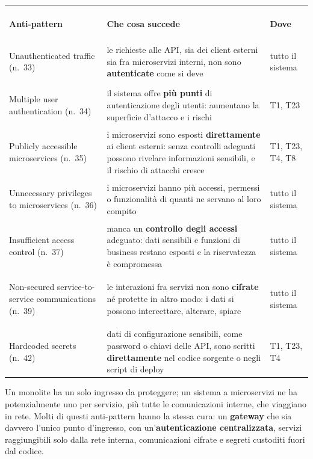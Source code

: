 \begin{center}
\renewcommand{\arraystretch}{1.3}
\begin{tabular}{@{}>{\bfseries\raggedright\arraybackslash}p{3.7cm} >{\raggedright\arraybackslash}p{9.6cm}
                >{\raggedright\arraybackslash}p{2.1cm}@{}}
  \toprule
  \multicolumn{3}{@{}l}{\textcolor{swteal}{\textbf{Sicurezza}}} \\
  \normalfont\textbf{Anti-pattern} & \textbf{Che cosa succede} & \textbf{Dove} \\
  \midrule
  Unauthenticated traffic (n.~33) & le richieste alle API, sia dei client esterni sia fra microservizi interni, non sono
    \textbf{autenticate} come si deve & tutto il sistema \\
  Multiple user authentication (n.~34) & il sistema offre \textbf{più punti} di autenticazione degli utenti: aumentano la
    superficie d'attacco e i rischi & T1, T23 \\
  Publicly accessible microservices (n.~35) & i microservizi sono esposti \textbf{direttamente} ai client esterni: senza
    controlli adeguati possono rivelare informazioni sensibili, e il rischio di attacchi cresce & T1, T23, T4, T8 \\
  Unnecessary privileges to microservices (n.~36) & i microservizi hanno più accessi, permessi o funzionalità di quanti
    ne servano al loro compito & tutto il sistema \\
  Insufficient access control (n.~37) & manca un \textbf{controllo degli accessi} adeguato: dati sensibili e funzioni di
    business restano esposti e la riservatezza è compromessa & tutto il sistema \\
  Non-secured service-to-service communications (n.~39) & le interazioni fra servizi non sono \textbf{cifrate} né
    protette in altro modo: i dati si possono intercettare, alterare, spiare & tutto il sistema \\
  Hardcoded secrets (n.~42) & dati di configurazione sensibili, come password o chiavi delle API, sono scritti
    \textbf{direttamente} nel codice sorgente o negli script di deploy & T1, T23, T4 \\
  \bottomrule
\end{tabular}
\end{center}

Un monolite ha un solo ingresso da proteggere; un sistema a microservizi ne ha potenzialmente uno per servizio, più tutte
le comunicazioni interne, che viaggiano in rete. Molti di questi anti-pattern hanno la stessa cura: un \textbf{gateway}
che sia davvero l'unico punto d'ingresso, con un'\textbf{autenticazione centralizzata}, servizi raggiungibili solo dalla
rete interna, comunicazioni cifrate e segreti custoditi fuori dal codice.

